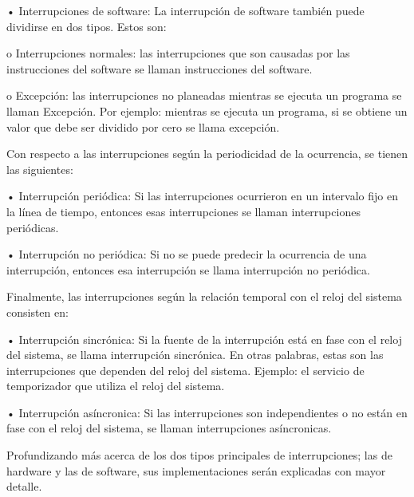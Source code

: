 \documentclass[12pt]{article}
\begin{document}
{•	Interrupciones de software: La interrupción de software también puede dividirse en dos tipos. Estos son:

\hspace{10mm}o	Interrupciones normales: las interrupciones que son causadas por las instrucciones del software se llaman instrucciones del software.
    
\hspace{10mm}o	Excepción: las interrupciones no planeadas mientras se ejecuta un programa se llaman Excepción. Por ejemplo: mientras se ejecuta un programa, si se obtiene un valor que debe ser dividido por cero se llama excepción.
\newline
    
Con respecto a las interrupciones según la periodicidad de la ocurrencia, se tienen las siguientes:
\newline

•	Interrupción periódica: Si las interrupciones ocurrieron en un intervalo fijo en la línea de tiempo, entonces esas interrupciones se llaman interrupciones periódicas.

•	Interrupción no periódica: Si no se puede predecir la ocurrencia de una interrupción, entonces esa interrupción se llama interrupción no periódica.
\newline

Finalmente, las interrupciones según la relación temporal con el reloj del sistema consisten en:
\newline

•	Interrupción sincrónica: Si la fuente de la interrupción está en fase con el reloj del sistema, se llama interrupción sincrónica. En otras palabras, estas son las interrupciones que dependen del reloj del sistema. Ejemplo: el servicio de temporizador que utiliza el reloj del sistema.

•	Interrupción asíncronica: Si las interrupciones son independientes o no están en fase con el reloj del sistema, se llaman interrupciones asíncronicas.   \citep{LambdaEcu}
\newline

Profundizando más acerca de los dos tipos principales de interrupciones; las de hardware y las de software, sus implementaciones serán explicadas con mayor detalle. 
\newline

}
\end{document}
